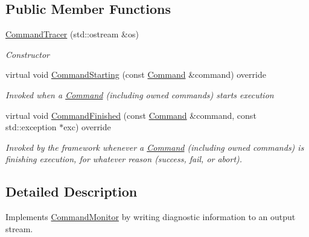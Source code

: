 \subsection*{Public Member Functions}
\begin{DoxyCompactItemize}
\item 
\mbox{\hyperlink{class_command_lib_1_1_command_tracer_a415c9eb7f65bbab0356f6beae82a51bf}{Command\+Tracer}} (std\+::ostream \&os)
\begin{DoxyCompactList}\small\item\em Constructor\end{DoxyCompactList}\item 
\mbox{\label{class_command_lib_1_1_command_tracer_a8bf102840bfad1186d0a693590afd9f9}} 
virtual void \mbox{\hyperlink{class_command_lib_1_1_command_tracer_a8bf102840bfad1186d0a693590afd9f9}{Command\+Starting}} (const \mbox{\hyperlink{class_command_lib_1_1_command}{Command}} \&command) override
\begin{DoxyCompactList}\small\item\em Invoked when a \mbox{\hyperlink{class_command_lib_1_1_command}{Command}} (including owned commands) starts execution  \end{DoxyCompactList}\item 
\mbox{\label{class_command_lib_1_1_command_tracer_a8ed510ffcee868c92e388d1e3af304d7}} 
virtual void \mbox{\hyperlink{class_command_lib_1_1_command_tracer_a8ed510ffcee868c92e388d1e3af304d7}{Command\+Finished}} (const \mbox{\hyperlink{class_command_lib_1_1_command}{Command}} \&command, const std\+::exception $\ast$exc) override
\begin{DoxyCompactList}\small\item\em Invoked by the framework whenever a \mbox{\hyperlink{class_command_lib_1_1_command}{Command}} (including owned commands) is finishing execution, for whatever reason (success, fail, or abort).  \end{DoxyCompactList}\end{DoxyCompactItemize}


\subsection{Detailed Description}
Implements \mbox{\hyperlink{class_command_lib_1_1_command_monitor}{Command\+Monitor}} by writing diagnostic information to an output stream. 



